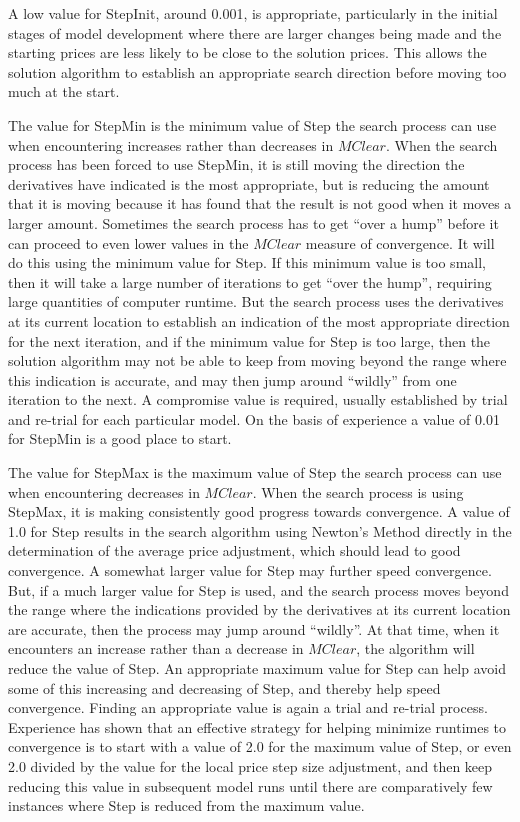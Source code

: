 A low value for StepInit, around 0.001, is appropriate, particularly in the initial stages of model development where there are larger changes being made and the starting prices are less likely to be close to the solution prices.  This allows the solution algorithm to establish an appropriate search direction before moving too much at the start.

The value for StepMin is the minimum value of Step the search process can use when encountering increases rather than decreases in $MClear$.  When the search process has been forced to use StepMin, it is still moving the direction the derivatives have indicated is the most appropriate, but is reducing the amount that it is moving because it has found that the result is not good when it moves a larger amount.  Sometimes the search process has to get ``over a hump'' before it can proceed to even lower values in the $MClear$ measure of convergence.  It will do this using the minimum value for Step.  If this minimum value is too small, then it will take a large number of iterations to get ``over the hump'', requiring large quantities of computer runtime. But the search process uses the derivatives at its current location to establish an indication of the most appropriate direction for the next iteration, and if the minimum value for Step is too large, then the solution algorithm may not be able to keep from moving beyond the range where this indication is accurate, and may then jump around ``wildly'' from one iteration to the next. A compromise value is required, usually established by trial and re-trial for each particular model. On the basis of experience a value of 0.01 for StepMin is a good place to start. 

The value for StepMax is the maximum value of Step the search process can use when encountering decreases in $MClear$. When the search process is using StepMax, it is making consistently good progress towards convergence. A value of 1.0 for Step results in the search algorithm using Newton's Method directly in the determination of the average price adjustment, which should lead to good convergence. A somewhat larger value for Step may further speed convergence. But, if a much larger value for Step is used, and the search process moves beyond the range where the indications provided by the derivatives at its current location are accurate, then the process may jump around ``wildly''. At that time, when it encounters an increase rather than a decrease in $MClear$, the algorithm will reduce the value of Step. An appropriate maximum value for Step can help avoid some of this increasing and decreasing of Step, and thereby help speed convergence. Finding an appropriate value is again a trial and re-trial process. Experience has shown that an effective strategy for helping minimize runtimes to convergence is to start with a value of 2.0 for the maximum value of Step, or even 2.0 divided by the value for the local price step size adjustment, and then keep reducing this value in subsequent model runs until there are comparatively few instances where Step is reduced from the maximum value.

